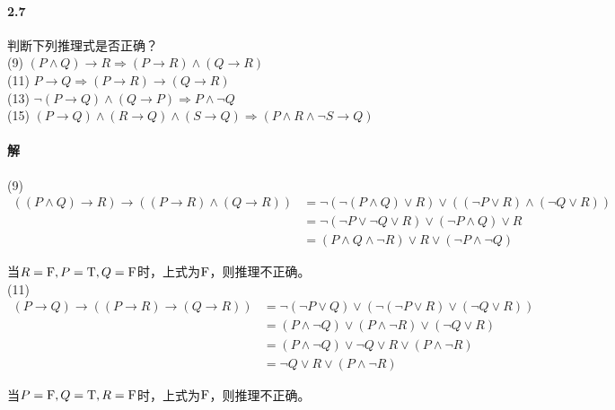 \documentclass[hyperref, UTF8]{ctexart}
\newcommand{\true}{{\rm T}}
\newcommand{\false}{{\rm F}}
\begin{document}
\paragraph{2.7}\label{2.7}
判断下列推理式是否正确？\\

(9) $ (P \land Q) \rightarrow R \Rightarrow (P \rightarrow R) \land (Q \rightarrow R) $ \\

(11) $ P \rightarrow Q \Rightarrow (P \rightarrow R) \rightarrow (Q \rightarrow R) $ \\

(13) $  \lnot (P \rightarrow Q) \land (Q \rightarrow P) \Rightarrow P \land \lnot Q $ \\

(15) $ (P \rightarrow Q) \land (R \rightarrow Q) \land (S \rightarrow Q) \Rightarrow (P \land R \land \lnot S \rightarrow Q) $ \\

\paragraph{解}

(9)
\begin{align*}
((P \land Q) \rightarrow R) \rightarrow ((P \rightarrow R) \land (Q \rightarrow R))
    &= \lnot ( \lnot (P \land Q) \lor R) \lor (( \lnot P \lor R) \land ( \lnot Q \lor R)) \\
    &= \lnot ( \lnot P \lor \lnot Q \lor R) \lor ( \lnot P \land Q) \lor R \\
    &= (P \land Q \land \lnot R) \lor R \lor ( \lnot P \land \lnot Q)
\end{align*}

当$R=\false, P=\true, Q=\false$时，上式为$\false$，则推理不正确。\\

(11)
\begin{align*}
(P \rightarrow Q) \rightarrow ((P \rightarrow R) \rightarrow (Q \rightarrow R))
    &= \lnot ( \lnot P \lor Q) \lor ( \lnot ( \lnot P \lor R) \lor ( \lnot Q \lor R)) \\
    &= (P \land \lnot Q) \lor (P \land \lnot R) \lor ( \lnot Q \lor R) \\
    &= (P \land \lnot Q) \lor \lnot Q \lor R \lor (P \land \lnot R) \\
    &= \lnot Q \lor R \lor (P \land \lnot R)
\end{align*}

当$P=\false, Q=\true, R=\false$时，上式为$\false$，则推理不正确。\\
\end{document}
